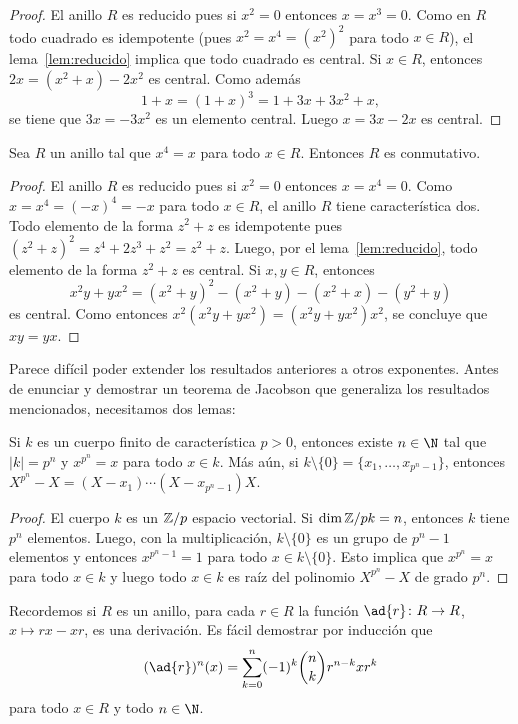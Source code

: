 \begin{proof}
	El anillo $R$ es reducido pues si $x^2=0$ entonces $x=x^3=0$.  Como en $R$
	todo cuadrado es idempotente (pues $x^2=x^4=(x^2)^2$ para todo $x\in R$),
	el lema~\ref{lem:reducido} implica que todo cuadrado es central. 
	Si $x\in R$, entonces 
	$2x=(x^2+x)-2x^2$ 
	es central. Como además 
	\[
		1+x=(1+x)^3=1+3x+3x^2+x,
	\]
	se tiene que $3x=-3x^2$ es un elemento central. Luego $x=3x-2x$ es central.
\end{proof}

\begin{proposition}
	Sea $R$ un anillo tal que $x^4=x$ para todo $x\in R$. Entonces $R$ es conmutativo.
\end{proposition}

\begin{proof}
	El anillo $R$ es reducido pues si $x^2=0$ entonces $x=x^4=0$.  Como
	$x=x^4=(-x)^4=-x$ para todo $x\in R$, el anillo $R$ tiene característica
	dos. Todo elemento de la forma $z^2+z$ es idempotente pues
	$(z^2+z)^2=z^4+2z^3+z^2=z^2+z$. Luego, por el 
	lema~\ref{lem:reducido}, todo elemento de la forma $z^2+z$ es central. Si $x,y\in R$, entonces 
	\[
		x^2y+yx^2=(x^2+y)^2-(x^2+y)-(x^2+x)-(y^2+y)
	\]
	es central. Como entonces $x^2(x^2y+yx^2)=(x^2y+yx^2)x^2$, se concluye que $xy=yx$.
\end{proof}

Parece difícil poder extender los resultados anteriores a otros exponentes. Antes 
de enunciar y demostrar un teorema de Jacobson que generaliza los resultados mencionados, necesitamos
dos lemas:

\begin{lemma}
	\label{lem:k_finito}
	Si $k$ es un cuerpo finito de característica $p>0$, entonces existe
	$n\in\N$ tal que $|k|=p^n$ y $x^{p^n}=x$ para todo $x\in k$. Más aún, si
	$k\setminus\{0\}=\{x_1,\dots,x_{p^n-1}\}$, entonces
	$X^{p^n}-X=(X-x_1)\cdots(X-x_{p^n-1})X$. 
\end{lemma}

\begin{proof}
	El cuerpo $k$ es un $\mathbb{Z}/p$ espacio vectorial. Si $\dim{\mathbb{Z}/p} k=n$, entonces 
	$k$ tiene $p^n$ elementos. Luego, con la multiplicación, $k\setminus\{0\}$ es un grupo de $p^{n}-1$ elementos y entonces 
	$x^{p^n-1}=1$ para todo $x\in k\setminus\{0\}$. Esto implica que $x^{p^n}=x$ para todo $x\in k$ y luego 
	todo $x\in k$ es raíz del polinomio $X^{p^n}-X$ de grado $p^n$. 
\end{proof}

Recordemos si $R$ es un anillo, para cada $r\in R$ la función $\ad{r}\colon
R\to R$, $x\mapsto rx-xr$, es una derivación. Es fácil demostrar por inducción que 
\begin{equation}
	\label{eq:Leibniz}
	(\ad{r})^n(x)=\sum_{k=0}^n(-1)^k\binom{n}{k}r^{n-k}xr^k
\end{equation}
para todo $x\in R$ y todo $n\in\N$. 

